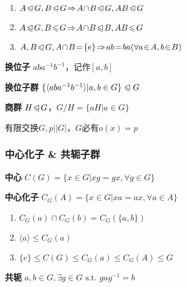 \documentclass[a4paper,10pt]{ctexart}
\newcommand*{\st}{\text{ s.t. }}
\newcommand*{\impl}{\Rightarrow}
\renewcommand*{\leq}{\leqslant}
\newcommand*{\nmsubgroupeq}{\trianglelefteqslant}
\newcommand*{\gengroup}[1]{\langle #1 \rangle}
\begin{document}
\begin{multicols}{3}
    \begin{theorem}[正规子群运算律]
        \hfil

        \begin{enumerate}
            \item $A \!\nmsubgroupeq\! G, B \!\nmsubgroupeq\! G \!\impl\! A \!\cap\! B \!\nmsubgroupeq\! G, AB \!\nmsubgroupeq\! G$
            \item $A \!\nmsubgroupeq\! G, B \!\leq\! G \!\impl\! A \!\cap\! B \!\nmsubgroupeq\! B, AB \!\leq\! G$
            \item $A, B \!\nmsubgroupeq\! G, A \!\cap\! B \! = \! \{e\} \!\impl\! ab \! = \! ba \\ (\forall a \!\in\! A, b \!\in\! B)$
        \end{enumerate}
    \end{theorem}

    \textbf{换位子} $aba^{-1}b^{-1}$，记作$[a,b]$

    \textbf{换位子群} $\{ \gengroup{aba^{-1}b^{-1}} | a, b \in G \} \nmsubgroupeq G$

    \textbf{商群} $H \!\nmsubgroupeq\! G$，$G/H = \{ aH | a \in G \}$

    \begin{theorem}[素阶元]
        有限交换$G, p||G|$，$G$必有$o(x) \! = \! p$
    \end{theorem}

    \subsubsection{中心化子 \& 共轭子群}

    \textbf{中心} $C(G) = \{ x \in G | xg = gx, \forall g \in G\}$

    \textbf{中心化子} $C_G(A) \! = \! \{x \!\in\! G | xa \! = \! ax, \forall a \!\in\! A\}$

    \begin{theorem}[中心化子性质]
        \hfil

        \begin{enumerate}
            \item $C_G(a) \cap C_G(b) = C_G(\{a, b\})$
            \item $\gengroup{a} \leq C_G(a)$
            \item $\{e\} \!\leq\! C(G) \!\leq\! C_G(a) \!\leq\! C_G(A) \!\leq\! G$
        \end{enumerate}
    \end{theorem}

    \textbf{共轭} $a, b \in G, \exists g \in G \st gag^{-1}=b$


\end{multicols}
\end{document}
